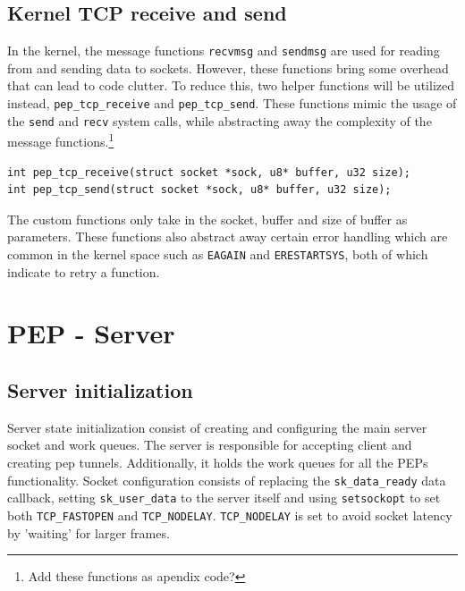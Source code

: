 \documentclass[a4paper,english, 11pt]{report}
\begin{document}
\subsection{Kernel TCP receive and send}
In the kernel, the message functions \verb|recvmsg| and \verb|sendmsg| are used for reading from and sending data to sockets. However, these functions bring some overhead that can lead to code clutter. To reduce this, two helper functions will be utilized instead, \verb|pep_tcp_receive| and \verb|pep_tcp_send|. These functions mimic the usage of the \verb|send| and \verb|recv| system calls, while abstracting away the complexity of the message functions.\footnote{Add these functions as apendix code?}

\begin{verbatim}
int pep_tcp_receive(struct socket *sock, u8* buffer, u32 size);
int pep_tcp_send(struct socket *sock, u8* buffer, u32 size);
\end{verbatim}

The custom functions only take in the socket, buffer and size of buffer as parameters. These functions also abstract away certain error handling which are common in the kernel space such as \verb|EAGAIN| and \verb|ERESTARTSYS|, both of which indicate to retry a function.

\section{PEP - Server}

\subsection{Server initialization}
Server state initialization consist of creating and configuring the main server socket and work queues. The server is responsible for accepting client and creating pep tunnels. Additionally, it holds the work queues for all the PEPs functionality. Socket configuration consists of replacing the \verb|sk_data_ready| data callback, setting \verb|sk_user_data| to the server itself and using \verb|setsockopt| to set both \verb|TCP_FASTOPEN| and \verb|TCP_NODELAY|. \verb|TCP_NODELAY| is set to avoid socket latency by 'waiting' for larger frames.
\end{document}
